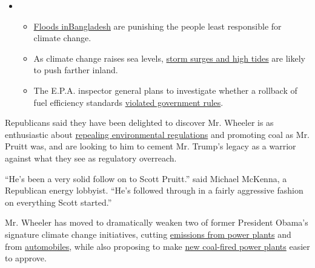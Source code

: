 \begin{itemize}
\item
  \begin{itemize}
  \tightlist
  \item
    \href{https://www.nytimes.com/2020/07/30/climate/bangladesh-floods.html?action=click\&pgtype=Article\&state=default\&region=MAIN_CONTENT_1\&context=storylines_keepup}{Floods
    in}\href{https://www.nytimes.com/2020/07/30/climate/bangladesh-floods.html?action=click\&pgtype=Article\&state=default\&region=MAIN_CONTENT_1\&context=storylines_keepup}{Bangladesh}
    are punishing the people least responsible for climate change.
  \item
    As climate change raises sea levels,
    \href{https://www.nytimes.com/2020/07/30/climate/sea-level-inland-floods.html?action=click\&pgtype=Article\&state=default\&region=MAIN_CONTENT_1\&context=storylines_keepup}{storm
    surges and high tides} are likely to push farther inland.
  \item
    The E.P.A. inspector general plans to investigate whether a rollback
    of fuel efficiency standards
    \href{https://www.nytimes.com/2020/07/27/climate/trump-fuel-efficiency-rule.html?action=click\&pgtype=Article\&state=default\&region=MAIN_CONTENT_1\&context=storylines_keepup}{violated
    government rules}.
  \end{itemize}
\end{itemize}

Republicans said they have been delighted to discover Mr. Wheeler is as
enthusiastic about
\href{https://www.nytimes.com/interactive/2017/10/05/climate/trump-environment-rules-reversed.html}{repealing
environmental regulations} and promoting coal as Mr. Pruitt was, and are
looking to him to cement Mr. Trump's legacy as a warrior against what
they see as regulatory overreach.

``He's been a very solid follow on to Scott Pruitt.'' said Michael
McKenna, a Republican energy lobbyist. ``He's followed through in a
fairly aggressive fashion on everything Scott started.''

Mr. Wheeler has moved to dramatically weaken two of former President
Obama's signature climate change initiatives, cutting
\href{https://www.nytimes.com/2018/08/20/climate/epa-clean-power-rollback.html}{emissions
from power plants} and from
\href{https://www.nytimes.com/2018/08/02/climate/trump-auto-emissions-california.html}{automobiles},
while also proposing to make
\href{https://www.nytimes.com/2018/12/04/climate/epa-coal-carbon-capture.html}{new
coal-fired power plants} easier to approve.

